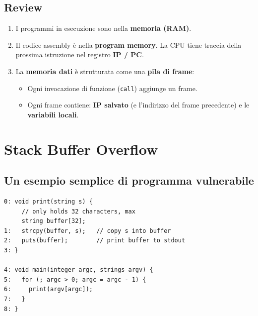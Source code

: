 \subsection{Review}

\begin{enumerate}
  \item I programmi in esecuzione sono nella \textbf{memoria (RAM)}.
  \item Il codice assembly \`e nella \textbf{program memory}. La CPU tiene traccia della prossima istruzione nel registro \textbf{IP / PC}.
  \item La \textbf{memoria dati} \`e strutturata come una \textbf{pila di frame}:
    \begin{itemize}
      \item Ogni invocazione di funzione (\texttt{call}) aggiunge un frame.
      \item Ogni frame contiene: \textbf{IP salvato} (e l'indirizzo del frame precedente) e le \textbf{variabili locali}.
    \end{itemize}
\end{enumerate}

\section{Stack Buffer Overflow}



\subsection{Un esempio semplice di programma vulnerabile}

\begin{verbatim}
0: void print(string s) {
     // only holds 32 characters, max
     string buffer[32];
1:   strcpy(buffer, s);   // copy s into buffer
2:   puts(buffer);        // print buffer to stdout
3: }

4: void main(integer argc, strings argv) {
5:   for (; argc > 0; argc = argc - 1) {
6:     print(argv[argc]);
7:   }
8: }
\end{verbatim}

